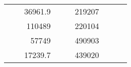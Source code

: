 \begin{table}[H]
\begin{tabular}{|ccrccrccc}
\multicolumn{1}{|c|}{\cellcolor[HTML]{FFFFC7}}                                & \multicolumn{1}{c|}{\cellcolor[HTML]{DAE8FC}}                      & \multicolumn{1}{r|}{\cellcolor[HTML]{DAE8FC}36961.9}   & \multicolumn{1}{c|}{\cellcolor[HTML]{FFFFC7}}                                & \multicolumn{1}{c|}{\cellcolor[HTML]{DAE8FC}}                       & \multicolumn{1}{r|}{\cellcolor[HTML]{DDFDFF}219207}    &                                                                              &                                                                    &                                                        \\ \cline{3-3} \cline{6-6}
\multicolumn{1}{|c|}{\cellcolor[HTML]{FFFFC7}}                                & \multicolumn{1}{c|}{\cellcolor[HTML]{DAE8FC}}                      & \multicolumn{1}{r|}{\cellcolor[HTML]{DDFDFF}110489}    & \multicolumn{1}{c|}{\cellcolor[HTML]{FFFFC7}}                                & \multicolumn{1}{c|}{\cellcolor[HTML]{DAE8FC}}                       & \multicolumn{1}{r|}{\cellcolor[HTML]{DAE8FC}220104}    &                                                                              &                                                                    &                                                        \\ \cline{3-3} \cline{6-6}
\multicolumn{1}{|c|}{\cellcolor[HTML]{FFFFC7}}                                & \multicolumn{1}{c|}{\cellcolor[HTML]{DAE8FC}}                      & \multicolumn{1}{r|}{\cellcolor[HTML]{DAE8FC}57749}     & \multicolumn{1}{c|}{\cellcolor[HTML]{FFFFC7}}                                & \multicolumn{1}{c|}{\cellcolor[HTML]{DAE8FC}}                       & \multicolumn{1}{r|}{\cellcolor[HTML]{DDFDFF}490903}    &                                                                              &                                                                    &                                                        \\ \cline{3-3} \cline{6-6}
\multicolumn{1}{|c|}{\cellcolor[HTML]{FFFFC7}}                                & \multicolumn{1}{c|}{\cellcolor[HTML]{DAE8FC}}                      & \multicolumn{1}{r|}{\cellcolor[HTML]{DDFDFF}17239.7}   & \multicolumn{1}{c|}{\cellcolor[HTML]{FFFFC7}}                                & \multicolumn{1}{c|}{\cellcolor[HTML]{DAE8FC}}                       & \multicolumn{1}{r|}{\cellcolor[HTML]{DAE8FC}439020}    &                                                                              &                                                                    &                                                        \\ \cline{3-3} \cline{6-6}

\end{tabular}
\end{table}
